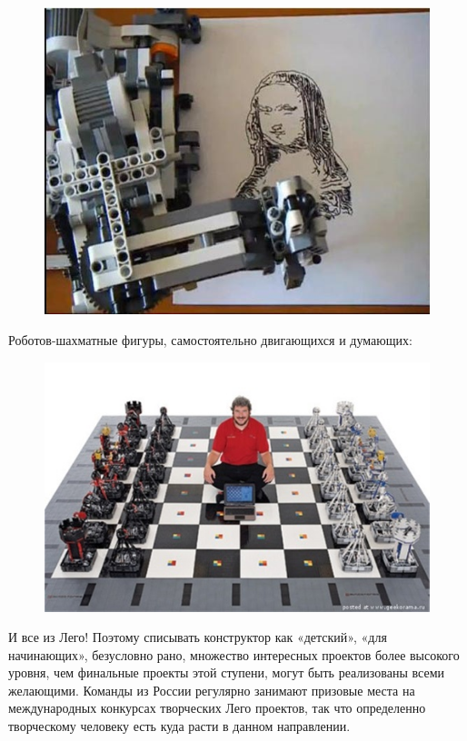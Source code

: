 \begin{figure}[h!]
	\begin{center}
		\includegraphics[width=0.83\linewidth]{chapters/chapter30/images/3}
		\caption{}
		\label{ris:image30x3}
	\end{center}
\end{figure}

Роботов-шахматные фигуры, самостоятельно двигающихся и думающих:

\begin{figure}[h!]
	\begin{center}
		\includegraphics[width=0.83\linewidth]{chapters/chapter30/images/4}
		\caption{}
		\label{ris:image30x4}
	\end{center}
\end{figure}

И все из Лего! Поэтому списывать конструктор как «детский», «для начинающих», безусловно рано, множество интересных проектов более высокого уровня, чем финальные проекты этой ступени, могут быть реализованы всеми желающими. Команды из России регулярно занимают призовые места на международных конкурсах творческих Лего проектов, так что определенно творческому человеку есть куда расти в данном направлении.\\\\

